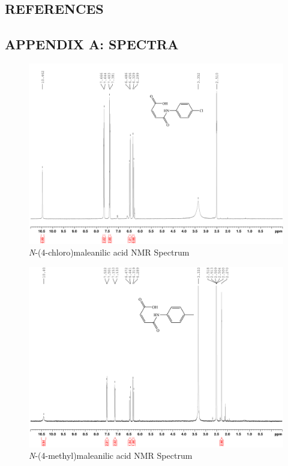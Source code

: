 \documentclass[11pt]{article}
\begin{document}
\newpage
\subsection*{REFERENCES}
\vspace{2mm}


\newpage
\subsection*{APPENDIX A: SPECTRA}

\begin{figure}[H]
    \centering
    \includegraphics[scale=0.105]{spectra/nmr9.1.png}
    \caption{\textit{N}-(4-chloro)maleanilic acid NMR Spectrum}
\end{figure}
\begin{figure}[H]
    \centering
    \includegraphics[scale=0.105]{spectra/nmr10.1.png}
    \caption{\textit{N}-(4-methyl)maleanilic acid NMR Spectrum}
\end{figure}
\end{document}
